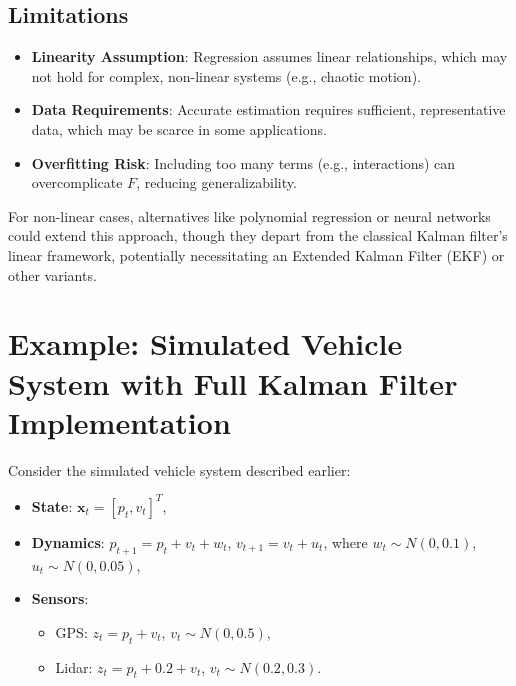 \documentclass[12pt]{article}
\begin{document}
\subsection{Limitations}
\begin{itemize}
    \item \textbf{Linearity Assumption}: Regression assumes linear relationships, which may not hold for complex, non-linear systems (e.g., chaotic motion).
    \item \textbf{Data Requirements}: Accurate estimation requires sufficient, representative data, which may be scarce in some applications.
    \item \textbf{Overfitting Risk}: Including too many terms (e.g., interactions) can overcomplicate \( F \), reducing generalizability.
\end{itemize}

For non-linear cases, alternatives like polynomial regression or neural networks could extend this approach, though they depart from the classical Kalman filter’s linear framework, potentially necessitating an Extended Kalman Filter (EKF) or other variants.

\section{Example: Simulated Vehicle System with Full Kalman Filter Implementation}
\label{sec:example}

Consider the simulated vehicle system described earlier:
\begin{itemize}
    \item \textbf{State}: \( \mathbf{x}_t = [p_t, v_t]^T \),
    \item \textbf{Dynamics}: \( p_{t+1} = p_t + v_t + w_t \), \( v_{t+1} = v_t + u_t \), where \( w_t \sim N(0, 0.1) \), \( u_t \sim N(0, 0.05) \),
    \item \textbf{Sensors}:
    \begin{itemize}
        \item GPS: \( z_t = p_t + v_t \), \( v_t \sim N(0, 0.5) \),
        \item Lidar: \( z_t = p_t + 0.2 + v_t \), \( v_t \sim N(0.2, 0.3) \).
    \end{itemize}
\end{itemize}
\end{document}
